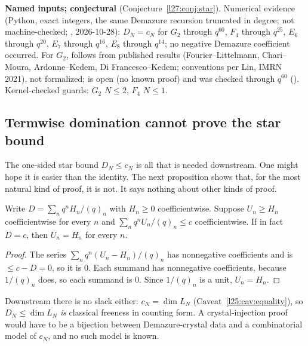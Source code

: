 \begin{status}
\textbf{Named inputs; conjectural} (Conjecture~\ref{l27:conj:star}). Numerical evidence (Python, exact integers,
the same Demazure recursion truncated in degree; not machine-checked; ,
2026-10-28): $D_N=c_N$ for $G_2$ through $q^{60}$, $F_4$ through $q^{25}$, $E_6$ through $q^{20}$, $E_7$ through
$q^{16}$, $E_8$ through $q^{14}$; no negative Demazure coefficient occurred. For $G_2$,
 follows from published results (Fourier--Littelmann, Chari--Moura, Ardonne--Kedem,
Di Francesco--Kedem; conventions per Lin, IMRN 2021), not formalized;  is open (no known proof)
and was checked through $q^{60}$ (). Kernel-checked guards: $G_2$ $N\le2$, $F_4$ $N\le1$.
\end{status}

\subsection{Termwise domination cannot prove the star bound}\label{l25:sec:rigidity}

The one-sided star bound $D_N\le c_N$ is all that is needed downstream. One might hope it is easier than the identity.
The next proposition shows that, for the most natural kind of proof, it is not. It says nothing about other kinds of
proof.

\begin{proposition}\label{l25:prop:rigidity}
Write $D=\sum_nq^nH_n/(q)_n$ with $H_n\ge0$ coefficientwise. Suppose $U_n\ge H_n$ coefficientwise for every $n$ and
$\sum_nq^nU_n/(q)_n\le c$ coefficientwise. If in fact $D=c$, then $U_n=H_n$ for every $n$.
\end{proposition}
\begin{proof}
The series $\sum_nq^n(U_n-H_n)/(q)_n$ has nonnegative coefficients and is $\le c-D=0$, so it is $0$. Each summand has
nonnegative coefficients, because $1/(q)_n$ does, so each summand is $0$. Since $1/(q)_n$ is a unit, $U_n=H_n$.
\end{proof}
\begin{physics}
Downstream there is no slack either: $c_N=\dim L_N$ (Caveat~\ref{l25:cav:equality}), so $D_N\le\dim L_N$ \emph{is}
classical freeness in counting form. A crystal-injection proof would have to be a bijection between Demazure-crystal
data and a combinatorial model of $c_N$, and no such model is known.
\end{physics}

